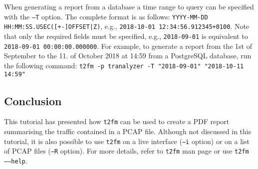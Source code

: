 \documentclass[documentation]{subfiles}
\begin{document}
When generating a report from a database a time range to query can be specified with the {\tt --T} option.
The complete format is as follows: {\tt YYYY-MM-DD HH:MM:SS.USEC([+-]OFFSET|Z)}, e.g., {\tt 2018-10-01 12:34:56.912345+0100}.
Note that only the required fields must be specified, e.g., {\tt 2018-09-01} is equivalent to {\tt 2018-09-01 00:00:00.000000}.
For example, to generate a report from the 1st of September to the 11. of October 2018 at 14:59 from a PostgreSQL database, run the following command:
{\tt t2fm -p tranalyzer -T "2018-09-01"  "2018-10-11 14:59"}

\subsection{Conclusion}
This tutorial has presented how {\tt t2fm} can be used to create a PDF report summarising the traffic contained in a PCAP file. Although not discussed in this tutorial, it is also possible to use {\tt t2fm} on a live interface ({\tt --i} option) or on a list of PCAP files ({\tt --R} option). For more details, refer to {\tt t2fm} man page or use {\tt t2fm --{}--help}.
\end{document}

